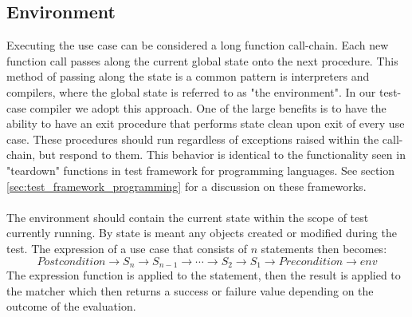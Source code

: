 \subsection{Environment}
Executing the use case can be considered a long function call-chain. Each new function call passes along the current global state onto the next procedure. This method of passing along the state is a common pattern is interpreters and compilers, where the global state is referred to as "the environment". In our test-case compiler we adopt this approach. One of the large benefits is to have the ability to have an exit procedure that performs state clean upon exit of every use case. These procedures should run regardless of exceptions raised within the call-chain, but respond to them. This behavior is identical to the functionality seen in "teardown" functions in test framework for programming languages. See section \ref{sec:test_framework_programming} for a discussion on these frameworks.\\\\
The environment should contain the current state within the scope of test currently running. By state is meant any objects created or modified during the test.
The expression of a use case that consists of $n$ statements then becomes: 
\begin{equation}
Postcondition \rightarrow S_n \rightarrow S_{n-1} \rightarrow \dotsb \rightarrow S_2 \rightarrow S_1 \rightarrow Precondition \rightarrow env
\end{equation}
The expression function is applied to the statement, then the result is applied to the matcher which then returns a success or failure value depending on the outcome of the evaluation.




